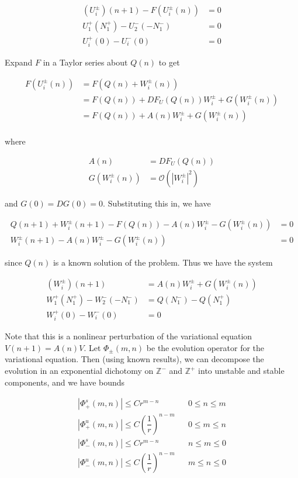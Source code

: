 \documentclass[12pt]{article}
\def\Z{{\mathbb Z}}
\begin{document}
\begin{align}
(U_i^\pm)(n+1) - F(U_i^\pm(n)) &= 0 \\
U_1^+(N_1^+) - U_2^-(-N_1^-) &= 0 \\
U_i^+(0) - U_i^-(0) &= 0
\end{align}

Expand $F$ in a Taylor series about $Q(n)$ to get

\begin{align*}
F(U_i^\pm(n)) &= F(Q(n) + W_i^\pm(n)) \\
&= F(Q(n)) + DF_{U}(Q(n)) W_i^\pm + G(W_i^\pm(n)) \\
&= F(Q(n)) + A(n) W_i^\pm + G(W_i^\pm(n)) \\
\end{align*}

where

\begin{align*}
A(n) &= DF_{U}(Q(n)) \\
G(W_i^\pm(n)) &= \mathcal{O}(|W_i^\pm|^2)
\end{align*}

and $G(0) = DG(0) = 0$. Substituting this in, we have

\begin{align*}
Q(n+1) + W_i^\pm(n+1) - F(Q(n)) - A(n) W_i^\pm - G(W_i^\pm(n)) &= 0\\
W_i^\pm(n+1) - A(n) W_i^\pm - G(W_i^\pm(n)) &= 0
\end{align*} 

since $Q(n)$ is a known solution of the problem. Thus we have the system

\begin{align}
(W_i^\pm)(n+1) &= A(n) W_i^\pm + G(W_i^\pm(n))  \\
W_1^+(N_1^+) - W_2^-(-N_1^-) &= Q(N_1^-) - Q(N_1^+) \\
W_i^+(0) - W_i^-(0) &= 0
\end{align}

Note that this is a nonlinear perturbation of the variational equation $V(n+1) = A(n) V$. Let $\Phi_\pm(m, n)$ be the evolution operator for the variational equation. Then (using known results), we can decompose the evolution in an exponential dichotomy on $\Z^-$ and $\Z^+$ into unstable and stable components, and we have bounds

\begin{align*}
|\Phi_+^s(m, n)| \leq C r^{m - n} && 0 \leq n \leq m \\
|\Phi_+^u(m, n)| \leq C \left( \dfrac{1}{r} \right)^{n-m} && 0 \leq m \leq n \\
|\Phi_-^s(m, n)| \leq C r^{m - n} && n \leq m \leq 0 \\
|\Phi_-^u(m, n)| \leq C \left( \dfrac{1}{r} \right)^{n-m} && m \leq n \leq 0\\
\end{align*}
\end{document}
